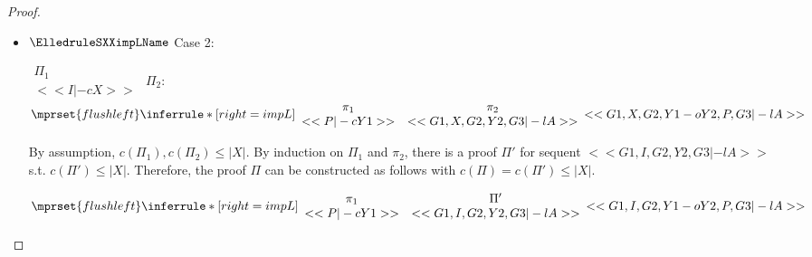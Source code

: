 \begin{proof}
\begin{enumerate}
\begin{itemize}
  \item $\ElledruleSXXimpLName$ Case 2:
      \begin{center}
        \scriptsize
        \begin{math}
          \begin{array}{c}
            \Pi_1 \\
            {<<I |-c X>>}
          \end{array}
        \end{math}
        \qquad\qquad
        $\Pi_2$:
        \begin{math}
          $$\mprset{flushleft}
          \inferrule* [right={\tiny impL}] {
            {
              \begin{array}{cc}
                \pi_1 & \pi_2 \\
                {<<P |-c Y1>>} & {<<G1, X, G2, Y2, G3 |-l A>>}
              \end{array}
            }
          }{<<G1, X, G2, Y1 -o Y2, P, G3 |-l A>>}
        \end{math}
      \end{center}
      By assumption, $c(\Pi_1),c(\Pi_2)\leq |X|$. By induction on $\Pi_1$ and $\pi_2$, there is
      a proof $\Pi'$ for sequent $<<G1, I, G2, Y2, G3 |-l A>>$ s.t. $c(\Pi') \leq |X|$.
      Therefore, the proof $\Pi$ can be constructed as follows with
      $c(\Pi) = c(\Pi') \leq |X|$.
      \begin{center}
        \scriptsize
        \begin{math}
          $$\mprset{flushleft}
          \inferrule* [right={\tiny impL}] {
            {
              \begin{array}{cc}
                \pi_1 & \Pi' \\
                {<<P |-c Y1>>} & {<<G1, I, G2, Y2, G3 |-l A>>}
              \end{array}
            }
          }{<<G1, I, G2, Y1 -o Y2, P, G3 |-l A>>}
        \end{math}
      \end{center}


\end{itemize}
\end{enumerate}
\end{proof}
